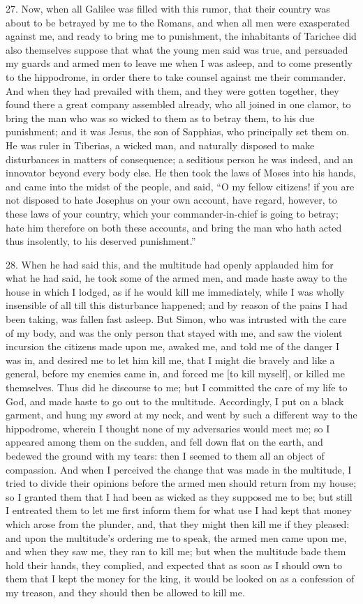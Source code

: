 27. Now, when all Galilee was filled with this rumor, that their country
was about to be betrayed by me to the Romans, and when all men were
exasperated against me, and ready to bring me to punishment, the
inhabitants of Tarichee did also themselves suppose that what the young
men said was true, and persuaded my guards and armed men to leave me when
I was asleep, and to come presently to the hippodrome, in order there to
take counsel against me their commander. And when they had prevailed with
them, and they were gotten together, they found there a great company
assembled already, who all joined in one clamor, to bring the man who was
so wicked to them as to betray them, to his due punishment; and it was
Jesus, the son of Sapphias, who principally set them on. He was ruler in
Tiberias, a wicked man, and naturally disposed to make disturbances in
matters of consequence; a seditious person he was indeed, and an innovator
beyond every body else. He then took the laws of Moses into his hands, and
came into the midst of the people, and said, ``O my fellow citizens! if you
are not disposed to hate Josephus on your own account, have regard,
however, to these laws of your country, which your commander-in-chief is
going to betray; hate him therefore on both these accounts, and bring the
man who hath acted thus insolently, to his deserved punishment.''

28. When he had said this, and the multitude had openly applauded him for
what he had said, he took some of the armed men, and made haste away to
the house in which I lodged, as if he would kill me immediately, while I
was wholly insensible of all till this disturbance happened; and by reason
of the pains I had been taking, was fallen fast asleep. But Simon, who was
intrusted with the care of my body, and was the only person that stayed
with me, and saw the violent incursion the citizens made upon me, awaked
me, and told me of the danger I was in, and desired me to let him kill me,
that I might die bravely and like a general, before my enemies came in,
and forced me [to kill myself], or killed me themselves. Thus did he
discourse to me; but I committed the care of my life to God, and made
haste to go out to the multitude. Accordingly, I put on a black garment,
and hung my sword at my neck, and went by such a different way to the
hippodrome, wherein I thought none of my adversaries would meet me; so I
appeared among them on the sudden, and fell down flat on the earth, and
bedewed the ground with my tears: then I seemed to them all an object of
compassion. And when I perceived the change that was made in the
multitude, I tried to divide their opinions before the armed men should
return from my house; so I granted them that I had been as wicked as they
supposed me to be; but still I entreated them to let me first inform them
for what use I had kept that money which arose from the plunder, and, that
they might then kill me if they pleased: and upon the multitude's ordering
me to speak, the armed men came upon me, and when they saw me, they ran to
kill me; but when the multitude bade them hold their hands, they complied,
and expected that as soon as I should own to them that I kept the money
for the king, it would be looked on as a confession of my treason, and
they should then be allowed to kill me.


